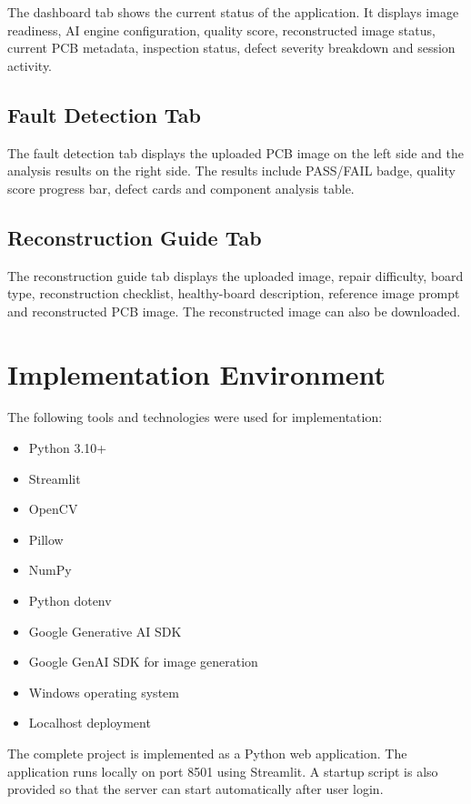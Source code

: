 \documentclass[12pt,a4paper]{report}
\begin{document}
The dashboard tab shows the current status of the application. It displays image readiness, AI engine configuration, quality score, reconstructed image status, current PCB metadata, inspection status, defect severity breakdown and session activity.

\section{Fault Detection Tab}

The fault detection tab displays the uploaded PCB image on the left side and the analysis results on the right side. The results include PASS/FAIL badge, quality score progress bar, defect cards and component analysis table.

\section{Reconstruction Guide Tab}

The reconstruction guide tab displays the uploaded image, repair difficulty, board type, reconstruction checklist, healthy-board description, reference image prompt and reconstructed PCB image. The reconstructed image can also be downloaded.

\chapter{Implementation Environment}

The following tools and technologies were used for implementation:

\begin{itemize}
    \item Python 3.10+
    \item Streamlit
    \item OpenCV
    \item Pillow
    \item NumPy
    \item Python dotenv
    \item Google Generative AI SDK
    \item Google GenAI SDK for image generation
    \item Windows operating system
    \item Localhost deployment
\end{itemize}

The complete project is implemented as a Python web application. The application runs locally on port 8501 using Streamlit. A startup script is also provided so that the server can start automatically after user login.
\end{document}
